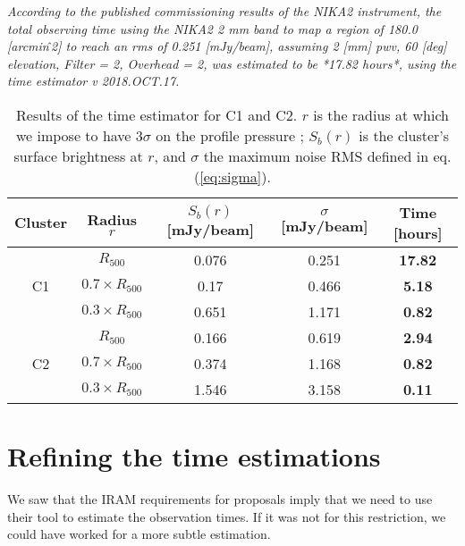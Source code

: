 \documentclass[11pt]{article}
\newcommand{\fh}{_{500}}
\begin{document}
\vspace{15pt}
\begin{minipage}{0.9\textwidth}
    \textit{According to the published commissioning results of the NIKA2 instrument, the total observing time using the NIKA2 2 mm band to map a region of 180.0 [arcmin\^\,2] to reach an rms of 0.251 [mJy/beam], assuming 2 [mm] pwv, 60 [deg] elevation, Filter = 2, Overhead = 2, was estimated to be *17.82 hours*, using the time estimator v 2018.OCT.17.}
\end{minipage}
\vspace{15pt}

\begin{table}[ht]
    \centering
    \begin{tabular}{c c c c c}
        \toprule
        Cluster  &  Radius $r$  &  $S_b(r)$ [mJy/beam]  &  $\sigma$ [mJy/beam]  &  \textbf{Time [hours]} \\
        \midrule\midrule
        \multirow{3}{60pt}{\centering C1}  
            &  $R\fh$            & 0.076  &  0.251  &  \textbf{17.82}  \\ 
            &  $0.7\times R\fh$  & 0.17   &  0.466  &  \textbf{5.18}  \\ 
            &  $0.3\times R\fh$  & 0.651  &  1.171  &  \textbf{0.82}  \\ 
        \midrule
        \multirow{3}{60pt}{\centering C2}  
            &  $R\fh$            & 0.166  &  0.619  &  \textbf{2.94}  \\ 
            &  $0.7\times R\fh$  & 0.374  &  1.168  &  \textbf{0.82}  \\ 
            &  $0.3\times R\fh$  & 1.546  &  3.158  &  \textbf{0.11}  \\ 
        \bottomrule
    \end{tabular}
    \caption{Results of the time estimator for C1 and C2. $r$ is the radius at which we impose to have $3\sigma$ on the profile pressure ; $S_b(r)$ is the cluster's surface brightness at $r$, and $\sigma$ the maximum noise RMS defined in eq. (\ref{eq:sigma}).}
    \label{tab:results}
\end{table}

\section{Refining the time estimations}

We saw that the IRAM requirements for proposals imply that we need to use their tool to estimate the observation times.
If it was not for this restriction, we could have worked for a more subtle estimation.
\end{document}
